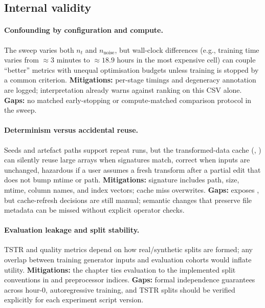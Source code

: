 \subsection{Internal validity}

\paragraph{Confounding by configuration and compute.}
The sweep varies both $n_t$ and $n_{\text{noise}}$, but wall-clock differences (e.g., training time varies from $\approx 3$ minutes to $\approx 18.9$ hours in the most expensive cell) can couple ``better'' metrics with unequal optimisation budgets unless training is stopped by a common criterion.
\textbf{Mitigations:} per-stage timings and degeneracy annotation are logged; interpretation already warns against ranking on this CSV alone.
\textbf{Gaps:} no matched early-stopping or compute-matched comparison protocol in the sweep.

\paragraph{Determinism versus accidental reuse.}
Seeds and artefact paths support repeat runs, but the transformed-data cache (, ) can silently reuse large arrays when signatures match, correct when inputs are unchanged, hazardous if a user assumes a fresh transform after a partial edit that does not bump mtime or path.
\textbf{Mitigations:} signature includes path, size, mtime, column names, and index vectors; cache miss overwrites.
\textbf{Gaps:}  exposes , but cache-refresh decisions are still manual; semantic changes that preserve file metadata can be missed without explicit operator checks.

\paragraph{Evaluation leakage and split stability.}
TSTR and quality metrics depend on how real/synthetic splits are formed; any overlap between training generator inputs and evaluation cohorts would inflate utility.
\textbf{Mitigations:} the chapter ties evaluation to the implemented split conventions in  and preprocessor indices.
\textbf{Gaps:} formal independence guarantees across hour-0, autoregressive training, and TSTR splits should be verified explicitly for each experiment script version.

